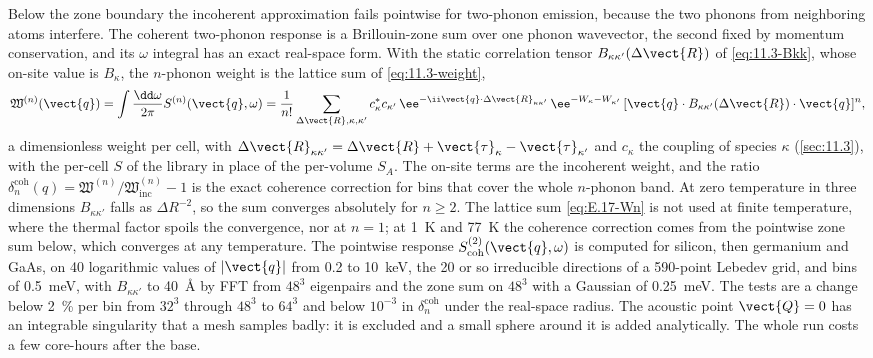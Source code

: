 Below the zone boundary the incoherent approximation fails pointwise for two-phonon emission, because the two phonons from neighboring atoms interfere. The coherent two-phonon response is a Brillouin-zone sum over one phonon wavevector, the second fixed by momentum conservation, and its $\omega$ integral has an exact real-space form. With the static correlation tensor $B_{\kappa\kappa'}(\Delta\vect{R})$ of \cref{eq:11.3-Bkk}, whose on-site value is $B_\kappa$, the $n$-phonon weight is the lattice sum of \cref{eq:11.3-weight},
\begin{equation}
  \mathfrak{W}^{(n)}(\vect{q}) = \int\frac{\dd\omega}{2\pi}S^{(n)}(\vect{q},\omega) = \frac{1}{n!}\sum_{\Delta\vect{R},\kappa,\kappa'}c_\kappa^*c_{\kappa'}\,\ee^{-\ii\vect{q}\cdot\Delta\vect{R}_{\kappa\kappa'}}\,\ee^{-W_\kappa - W_{\kappa'}}\,[\vect{q}\cdot B_{\kappa\kappa'}(\Delta\vect{R})\cdot\vect{q}]^n ,
  \label{eq:E.17-Wn}
\end{equation}
a dimensionless weight per cell, with $\Delta\vect{R}_{\kappa\kappa'} = \Delta\vect{R} + \vect{\tau}_\kappa - \vect{\tau}_{\kappa'}$ and $c_\kappa$ the coupling of species $\kappa$ (\cref{sec:11.3}), with the per-cell $S$ of the library in place of the per-volume $S_A$. The on-site terms are the incoherent weight, and the ratio $\delta^{\mathrm{coh}}_n(q) = \mathfrak{W}^{(n)}/\mathfrak{W}^{(n)}_{\mathrm{inc}} - 1$ is the exact coherence correction for bins that cover the whole $n$-phonon band. At zero temperature in three dimensions $B_{\kappa\kappa'}$ falls as $\Delta R^{-2}$, so the sum converges absolutely for $n \ge 2$. The lattice sum \cref{eq:E.17-Wn} is not used at finite temperature, where the thermal factor spoils the convergence, nor at $n = 1$; at \SI{1}{K} and \SI{77}{K} the coherence correction comes from the pointwise zone sum below, which converges at any temperature. The pointwise response $S^{(2)}_{\mathrm{coh}}(\vect{q},\omega)$ is computed for silicon, then germanium and GaAs, on 40 logarithmic values of $|\vect{q}|$ from 0.2 to \SI{10}{keV}, the 20 or so irreducible directions of a 590-point Lebedev grid, and bins of \SI{0.5}{meV}, with $B_{\kappa\kappa'}$ to \SI{40}{\angstrom} by FFT from $48^3$ eigenpairs and the zone sum on $48^3$ with a Gaussian of \SI{0.25}{meV}. The tests are a change below \SI{2}{\percent} per bin from $32^3$ through $48^3$ to $64^3$ and below $10^{-3}$ in $\delta^{\mathrm{coh}}_n$ under the real-space radius. The acoustic point $\vect{Q} = 0$ has an integrable singularity that a mesh samples badly: it is excluded and a small sphere around it is added analytically. The whole run costs a few core-hours after the base.

